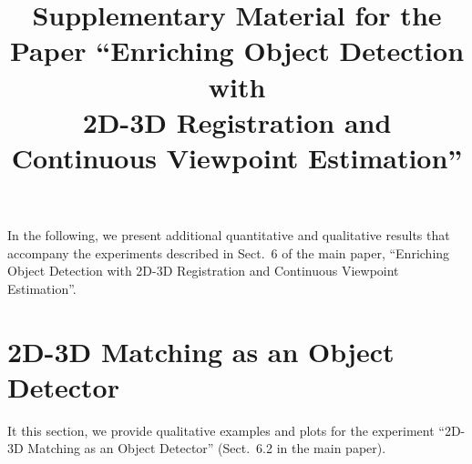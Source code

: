 \documentclass[10pt,twocolumn,letterpaper]{article}
\begin{document}
\title{Supplementary Material for the Paper ``Enriching Object Detection with\\2D-3D Registration and Continuous Viewpoint Estimation''}


\maketitle

In the following, we present additional quantitative and qualitative
results that accompany the experiments described in Sect.~6 of the
main paper, ``Enriching Object Detection with 2D-3D Registration and
Continuous Viewpoint Estimation''.

\section{2D-3D Matching as an Object Detector}
\label{sect:3dobject}
It this section, we provide qualitative examples and plots for the experiment
``2D-3D Matching as an Object Detector'' (Sect.~6.2 in the main
paper).
\end{document}
